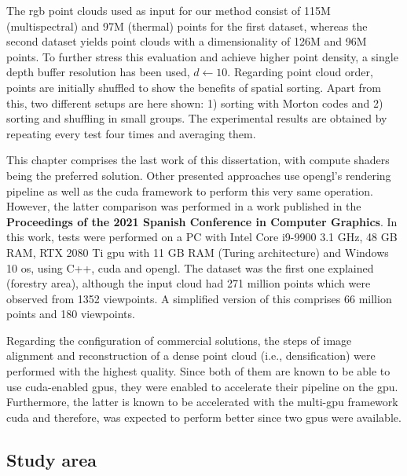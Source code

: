 The \acrshort{rgb} point clouds used as input for our method consist of 115M (multispectral) and 97M (thermal) points for the first dataset, whereas the second dataset yields point clouds with a dimensionality of 126M and 96M points. To further stress this evaluation and achieve higher point density, a single depth buffer resolution has been used, $d\gets 10$. Regarding point cloud order, points are initially shuffled to show the benefits of spatial sorting. Apart from this, two different setups are here shown: 1) sorting with Morton codes and 2) sorting and shuffling in small groups. The experimental results are obtained by repeating every test four times and averaging them. 

\begin{kaobox}[frametitle=\acrshort{opengl} and \acrshort{cuda} comparison]
This chapter comprises the last work of this dissertation, with compute shaders being the preferred solution. Other presented approaches use \acrshort{opengl}'s rendering pipeline as well as the \acrshort{cuda} framework to perform this very same operation. However, the latter comparison was performed in a work published in the \textbf{Proceedings of the 2021 Spanish Conference in Computer Graphics}. In this work, tests were performed on a PC with Intel Core i9-9900 3.1 GHz, 48 GB RAM, RTX 2080 Ti \acrshort{gpu} with 11 GB RAM (Turing architecture) and Windows 10 \acrshort{os}, using C++, \acrshort{cuda} and \acrshort{opengl}. The dataset was the first one explained (forestry area), although the input cloud had 271 million points which were observed from 1352 viewpoints. A simplified version of this comprises 66 million points and 180 viewpoints. 
\end{kaobox}

Regarding the configuration of commercial solutions, the steps of image alignment and reconstruction of a dense point cloud (i.e., densification) were performed with the highest quality. Since both of them are known to be able to use \acrshort{cuda}-enabled \acrshort{gpu}s, they were enabled to accelerate their pipeline on the \acrshort{gpu}. Furthermore, the latter is known to be accelerated with the multi-\acrshort{gpu} framework \acrshort{cuda} and therefore, was expected to perform better since two \acrshort{gpu}s were available.  

\subsection{Study area}

